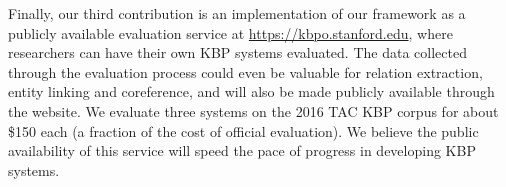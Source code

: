Finally, our third contribution is an implementation of our framework as a publicly available evaluation service at \url{https://kbpo.stanford.edu}, where researchers can have their own KBP systems evaluated.
The data collected through the evaluation process could even be valuable for relation extraction, entity linking and coreference, and will also be made publicly available through the website.
We evaluate three systems on the 2016 TAC KBP corpus for about \$150 each (a fraction of the cost of official evaluation).
We believe the public availability of this service will speed the pace of progress in developing KBP systems.
